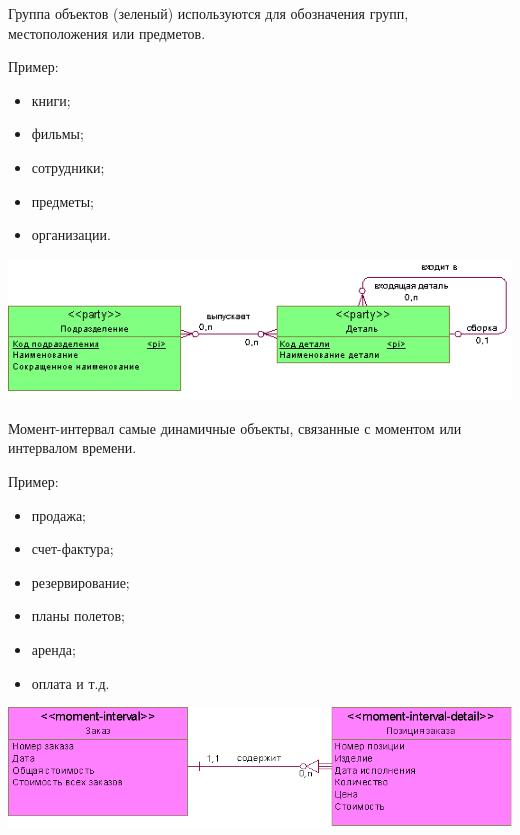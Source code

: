 \documentclass{beamer}
\begin{document}
\begin{frame}
\begin{block}{Группа объектов (зеленый)}
используются для обозначения групп, местоположения или предметов. 
\end{block}
Пример:
\begin{itemize}
\item книги;
\item фильмы;
\item сотрудники;
\item предметы;
\item организации.
\end{itemize}
\begin{center}
\includegraphics[scale=0.7]{images/lec03-pic03.png}
\end{center}
\end{frame}

\begin{frame}
\begin{block}{Момент-интервал}
самые динамичные объекты, связанные с моментом или интервалом времени.
\end{block}
Пример:
\begin{itemize}
\item продажа;
\item счет-фактура;
\item резервирование;
\item планы полетов;
\item аренда;
\item оплата и т.д.
\end{itemize}
\begin{center}
\includegraphics[scale=0.5]{images/lec03-pic02.png}
\end{center}
\end{frame}
\end{document}
